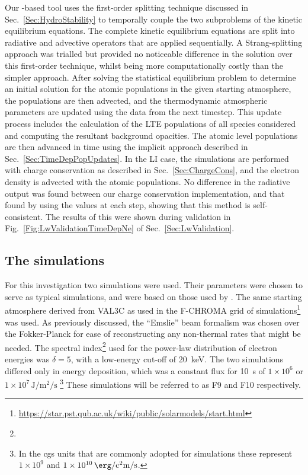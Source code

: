 Our \Lw{}-based tool uses the first-order splitting technique discussed in Sec.~\ref{Sec:HydroStability} to temporally couple the two subproblems of the kinetic equilibrium equations.
The complete kinetic equilibrium equations are split into radiative and advective operators that are applied sequentially.
A Strang-splitting approach was trialled but provided no noticeable difference in the solution over this first-order technique, whilst being more computationally costly than the simpler approach.
After solving the statistical equilibrium problem to determine an initial solution for the atomic populations in the given starting atmosphere, the populations are then advected, and the thermodynamic atmospheric parameters are updated using the \Radyn{} data from the next timestep.
This update process includes the calculation of the LTE populations of all species considered and computing the resultant background opacities.
The atomic level populations are then advanced in time using the implicit approach described in Sec.~\ref{Sec:TimeDepPopUpdates}.
In the LI case, the simulations are performed with charge conservation as described in Sec.~\ref{Sec:ChargeCons}, and the electron density is advected with the atomic populations.
No difference in the radiative output was found between our charge conservation implementation, and that found by using the \Radyn{} values at each step, showing that this method is self-consistent.
The results of this were shown during \Lw{} validation in Fig.~\ref{Fig:LwValidationTimeDepNe} of Sec.~\ref{Sec:LwValidation}.

\subsection{The \Radyn{} simulations}\label{Sec:CaiiRadynSims}

For this investigation two \Radyn{} simulations were used.
Their parameters were chosen to serve as typical simulations, and were based on those used by \citet{Kerr2019, Kerr2019a}.
The same starting atmosphere derived from VAL3C \citep{Vernazza1981} as used in the F-CHROMA grid of simulations\footnote{\url{https://star.pst.qub.ac.uk/wiki/public/solarmodels/start.html}} was used.
As previously discussed, the ``Emslie'' beam formalism was chosen over the Fokker-Planck for ease of reconstructing any non-thermal rates that might be needed.
The spectral index\footnote{} used for the power-law distribution of electron energies was $\delta=5$, with a low-energy cut-off of \SI{20}{\kilo\electronvolt}.
The two simulations differed only in energy deposition, which was a constant flux for \SI{10}{\second} of $1\times{}10^{6}$ or $1\times{}10^{7}\,\si{\joule\per\square\metre\per\second}$ \footnote{In the cgs units that are commonly adopted for \Radyn{} simulations these represent $1\times{}10^9$ and $1\times{}10^{10}\,\si{\erg\per\square\centi\metre\per\second}$.}
These simulations will be referred to as F9 and F10 respectively.


